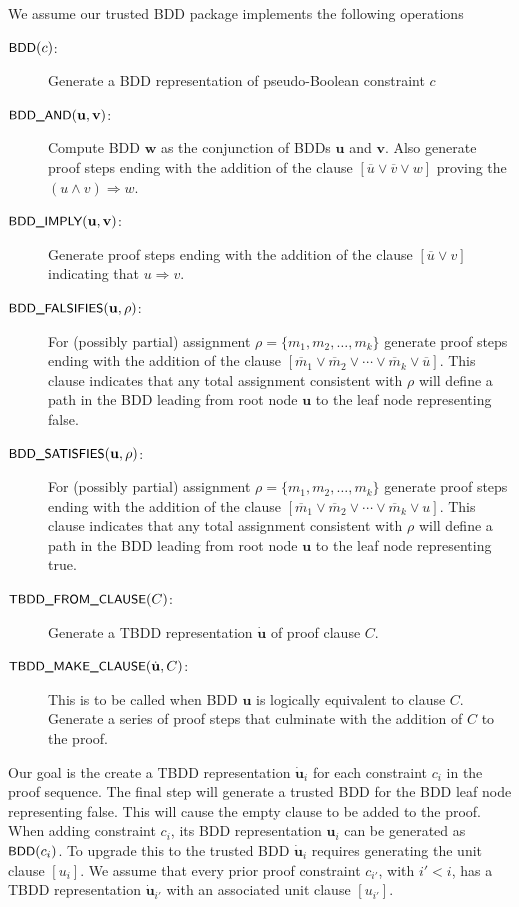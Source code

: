 \documentclass{easychair}
\renewcommand{\obar}[1]{\overline{#1}}
\newcommand{\mlit}{m}
\newcommand{\trust}[1]{\dot {#1}}
\newcommand{\assign}{\rho}
\newcommand{\imply}{\Rightarrow}
\newcommand{\fname}[1]{\mbox{\small\sf #1}}
\newcommand{\node}[1]{\mathbf{#1}}
\newcommand{\nodeu}{\node{u}}
\newcommand{\nodev}{\node{v}}
\newcommand{\nodew}{\node{w}}
\begin{document}
We assume our trusted BDD package implements the following operations
\begin{description}
\item[$\fname{BDD}(c)$:] Generate a BDD representation of pseudo-Boolean constraint $c$
\item[$\fname{BDD\_AND}(\nodeu, \nodev)$:] Compute BDD $\nodew$ as the conjunction of BDDs $\nodeu$ and $\nodev$.  Also generate proof steps ending with the addition of the clause $[\obar{u} \lor \obar{v} \lor w]$ proving the $(u \land v) \imply w$.
\item[$\fname{BDD\_IMPLY}(\nodeu, \nodev)$:]
  Generate proof steps ending with the addition of the clause $[\obar{u} \lor v]$ indicating that $u \imply v$.
\item[$\fname{BDD\_FALSIFIES}(\nodeu, \assign)$:] For (possibly partial) assignment $\assign = \{\mlit_1, \mlit_2, \ldots, \mlit_k\}$
  generate proof steps ending with the addition of the clause $[\obar{\mlit}_1 \lor \obar{\mlit}_2 \lor \cdots \lor \obar{\mlit}_k \lor \obar{u}]$.
  This clause indicates
  that any total assignment consistent with $\assign$ will define a path in the BDD leading from root node $\nodeu$ to the leaf node representing false.
\item[$\fname{BDD\_SATISFIES}(\nodeu, \assign)$:] For (possibly partial) assignment $\assign = \{\mlit_1, \mlit_2, \ldots, \mlit_k\}$
  generate proof steps ending with the addition of the clause $[\obar{\mlit}_1 \lor \obar{\mlit}_2 \lor \cdots \lor \obar{\mlit}_k \lor u]$.
  This clause indicates
  that any total assignment consistent with $\assign$ will define a path in the BDD leading from root node $\nodeu$ to the leaf node representing true.
\item[$\fname{TBDD\_FROM\_CLAUSE}(C)$:] Generate a TBDD representation $\trust{\nodeu}$ of proof clause $C$.
\item[$\fname{TBDD\_MAKE\_CLAUSE}(\trust{\nodeu}, C)$:]
This is to be called when BDD $\nodeu$ is logically equivalent to clause $C$.
Generate a series of proof steps that culminate with the addition of $C$ to the proof.
\end{description}

Our goal is the create a TBDD representation $\trust{\nodeu}_i$ for
each constraint $c_i$ in the proof sequence.  The final step will
generate a trusted BDD for the BDD leaf node representing false.  This
will cause the empty clause to be added to the proof.
When adding constraint $c_i$, its BDD
representation $\nodeu_i$ can be generated as $\fname{BDD}(c_i)$.  To upgrade
this to the trusted BDD $\trust{\nodeu}_i$ requires generating the unit clause $[u_i]$.
We assume that every prior proof constraint $c_{i'}$, with $i' < i$, has a TBDD representation $\trust{\nodeu}_{i'}$ with an associated unit clause
$[u_{i'}]$.
\end{document}
